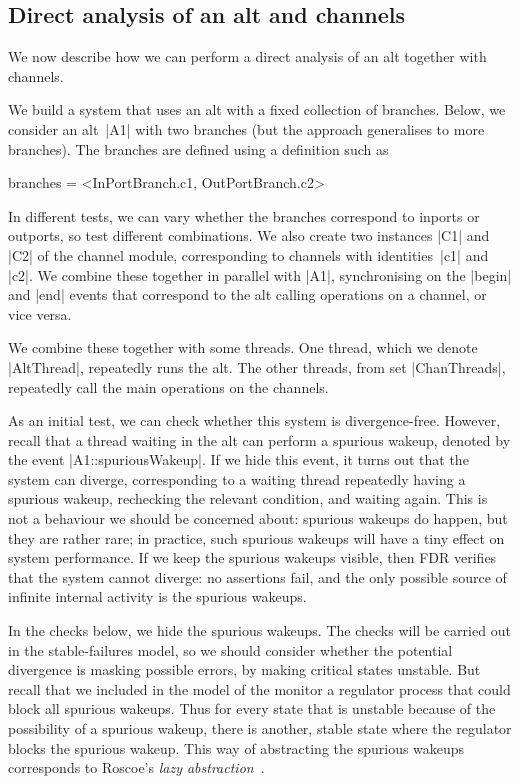 \subsection{Direct analysis of an alt and channels}
\label{sec:combined}

\inlineCSP

We now describe how we can perform a direct analysis of an alt together with
channels.  

We build a system that uses an alt with a fixed collection of branches.
Below, we consider an alt~|A1| with two branches (but the approach generalises
to more branches).  The branches are defined using a definition such as
%
\begin{cspm}
branches =  <InPortBranch.c1, OutPortBranch.c2>
\end{cspm}
%
In different tests, we can vary whether the branches correspond to inports or
outports, so test different combinations.  We also create two instances |C1|
and |C2| of the channel module, corresponding to channels with
identities~|c1| and |c2|.  We combine these together in parallel with |A1|,
synchronising on the |begin| and |end| events that correspond to the alt
calling operations on a channel, or vice versa.

We combine these together with some threads.  One thread, which we denote
|AltThread|, repeatedly runs the alt.  The other threads, from set
|ChanThreads|, repeatedly call the main operations on the channels.

As an initial test, we can check whether this system is divergence-free.
However, recall that a thread waiting in the alt can perform a spurious
wakeup, denoted by the event |A1::spuriousWakeup|.  If we hide this event, it
turns out that the system can diverge, corresponding to a waiting thread
repeatedly having a spurious wakeup, rechecking the relevant condition, and
waiting again.  This is not a behaviour we should be concerned about: spurious
wakeups do happen, but they are rather rare; in practice, such spurious
wakeups will have a tiny effect on system performance.  If we keep the
spurious wakeups visible, then FDR verifies that the system cannot diverge: no
assertions fail, and the only possible source of infinite internal activity is
the spurious wakeups.

In the checks below, we hide the spurious wakeups.  The checks will be carried
out in the stable-failures model, so we should consider whether the potential
divergence is masking possible errors, by making critical states unstable.
But recall that we included in the model of the monitor a regulator process
that could block all spurious wakeups.  Thus for every state that is unstable
because of the possibility of a spurious wakeup, there is another, stable
state where the regulator blocks the spurious wakeup.  This way of abstracting
the spurious wakeups corresponds to Roscoe's \emph{lazy
  abstraction}~\cite{awr:UCS}. 

